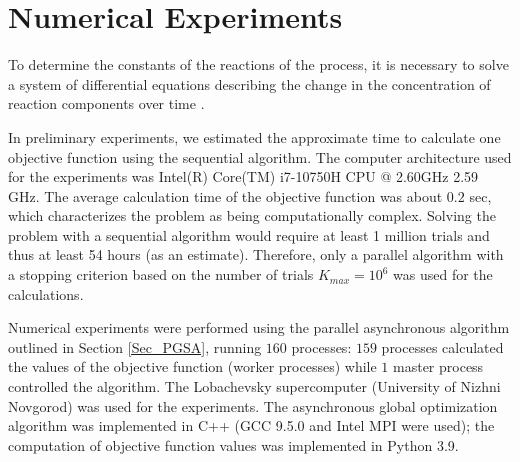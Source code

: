 \documentclass{svproc}
\begin{document}
\section{Numerical Experiments} \label{Sec_Exp}

To determine the constants of the reactions of the process, it is necessary to solve a system of differential equations describing the change in the concentration of reaction components over time \cite{cao2019}.

%


In preliminary experiments, we estimated the approximate time to calculate one objective function using the sequential algorithm. The computer architecture used for the experiments was Intel(R) Core(TM) i7-10750H CPU @ 2.60GHz 2.59 GHz. The average calculation time of the objective function was about $0.2$ sec, which characterizes the problem as being computationally complex.  Solving the problem with a sequential algorithm would require at least 1 million trials and thus at least 54 hours (as an estimate). Therefore, only a parallel algorithm with a stopping criterion based on the number of trials $K_{max}=10^6$ was used for the calculations. 

Numerical experiments were performed using the parallel asynchronous algorithm outlined in Section \ref{Sec_PGSA}, running $160$ processes: $159$ processes calculated the values of the objective function (worker processes) while $1$ master process controlled the algorithm. The Lobachevsky  supercomputer (University of Nizhni Novgorod) was used for the experiments. The asynchronous global optimization algorithm was implemented in C++ (GCC 9.5.0 and Intel MPI were used); the computation of objective function values was implemented in Python 3.9.
\end{document}
